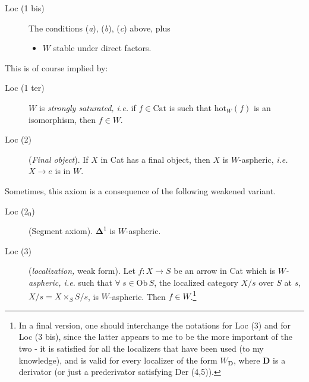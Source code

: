 \documentclass[11pt]{article}
\newcommand{\msp}[1]{\marginpar{\footnotesize [#1]}}
\newcommand{\Cat}{\mathrm{Cat}}
\newcommand{\Ob}{\mathrm{Ob}\,}
\newcommand{\hot}{\mathrm{hot}}
\begin{document}
\begin{description}
\item[Loc (1 bis)] The conditions (\textit{a}), (\textit{b}), (\textit{c}) above, plus
\begin{itemize}
\item[\textit{d})] $W$ stable under direct factors.
\end{itemize}
\end{description}

This is of course implied by:

\begin{description}
\item[Loc (1 ter)] $W$ is \textit{strongly saturated, i.e.} if $f \in \Cat$ is such that $\hot_W(f)$ is an isomorphism, then $f \in W$.
\item[Loc (2)] (\textit{Final object}). If $X$ in Cat has a final object, then $X$ is $W$-aspheric, \textit{i.e.} $X \longrightarrow e$ is in $W$.
\end{description}

Sometimes, this axiom is a consequence of the following weakened variant.

\begin{description}
\item[Loc (2$_0$)] (Segment axiom). $\boldsymbol{\Delta}^1$ is $W$-aspheric.
\end{description}

\msp{page 2}

\begin{description}
\item[Loc (3)] (\textit{localization,} weak form). Let $f : X \longrightarrow S$ be an arrow in Cat which is $W$\textit{-aspheric, i.e.} such that $\forall\ s \in \Ob S$, the localized category $X/s$ over $S$ at $s$, $X/s = X \times_S S/s$, is $W$-aspheric. Then $f \in W$.\footnote[1]{In a final version, one should interchange the notations for Loc (3) and for Loc (3 bis), since the latter appears to me to be the more important of the two - it is satisfied for all the localizers that have been used (to my knowledge), and is valid for every localizer of the form $W_{\mathbf{D}}$, where $\mathbf{D}$ is a derivator (or just a prederivator satisfying Der (4,5)).} %
\end{description}
\end{document}

